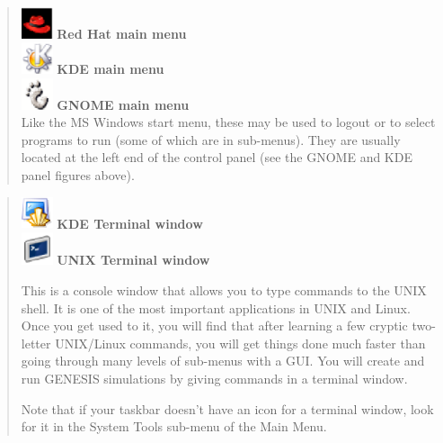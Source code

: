 \documentclass[12pt]{article}
\begin{document}
\begin{quote}
   \includegraphics[width=0.075\textwidth]{figures/redhat-main-menu32.eps} {\bf Red Hat main menu}\\
   \includegraphics[width=0.075\textwidth]{figures/kmenu.eps} {\bf KDE main menu}\\
   \includegraphics[width=0.075\textwidth]{figures/gnome-logo-icon32.eps} {\bf GNOME main menu}\\
   Like the MS Windows start menu, these may be used to logout or to select programs to run (some of which are in sub-menus). They are usually located at the left end of the control panel (see the GNOME and KDE panel figures above).

\end{quote}

\begin{quote}
   \includegraphics[width=0.075\textwidth]{figures/konsole.eps} {\bf KDE Terminal window} \\
   \includegraphics[width=0.075\textwidth]{figures/gnome-term.eps} {\bf UNIX Terminal window}

This is a console window that allows you to type commands to the UNIX shell. It is one of the most important applications in UNIX and Linux. Once you get used to it, you will find that after learning a few cryptic two-letter UNIX/Linux commands, you will get things done much faster than going through many levels of sub-menus with a GUI. You will create and run GENESIS simulations by giving commands in a terminal window.

Note that if your taskbar doesn't have an icon for a terminal window, look for it in the System Tools sub-menu of the Main Menu.
\end{quote}
\end{document}
